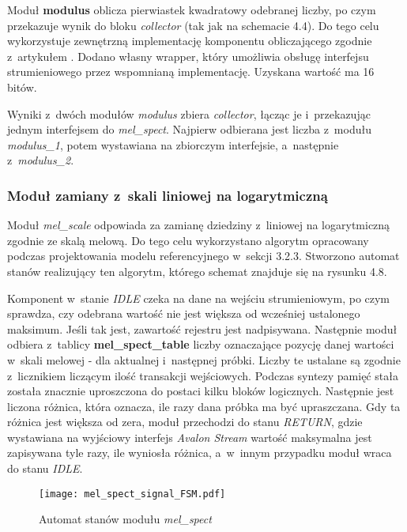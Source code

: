Moduł \textbf{modulus} oblicza pierwiastek kwadratowy odebranej liczby, po czym przekazuje wynik do bloku \textit{collector} (tak jak na schemacie 4.4). Do tego celu wykorzystuje zewnętrzną implementację komponentu obliczającego zgodnie z~artykułem \cite{Root}. Dodano własny wrapper, który umożliwia obsługę interfejsu strumieniowego przez wspomnianą implementację. Uzyskana wartość ma 16 bitów.

Wyniki z~dwóch modułów \textit{modulus} zbiera \textit{collector}, łącząc je i~przekazując jednym interfejsem do \textit{mel\_spect}. Najpierw odbierana jest liczba z~modułu \textit{modulus\_1}, potem wystawiana na zbiorczym interfejsie, a~następnie z~\textit{modulus\_2}.

\subsubsection{Moduł zamiany z~skali liniowej na logarytmiczną}

Moduł \textit{mel\_scale} odpowiada za zamianę dziedziny z~liniowej na logarytmiczną zgodnie ze skalą melową. Do tego celu wykorzystano algorytm opracowany podczas projektowania modelu referencyjnego w~sekcji 3.2.3. Stworzono automat stanów realizujący ten algorytm, którego schemat znajduje się na rysunku 4.8.

Komponent w~stanie \textit{IDLE} czeka na dane na wejściu strumieniowym, po czym sprawdza, czy odebrana wartość nie jest większa od wcześniej ustalonego maksimum. Jeśli tak jest, zawartość rejestru jest nadpisywana. Następnie moduł odbiera z~tablicy \textbf{mel\_spect\_table} liczby oznaczające pozycję danej wartości w~skali melowej - dla aktualnej i~następnej próbki. Liczby te ustalane są zgodnie z~licznikiem liczącym ilość transakcji wejściowych. Podczas syntezy pamięć stała została znacznie uproszczona do postaci kilku bloków logicznych. Następnie jest liczona różnica, która oznacza, ile razy dana próbka ma być upraszczana. Gdy ta różnica jest większa od zera, moduł przechodzi do stanu \textit{RETURN}, gdzie wystawiana na wyjściowy interfejs \textit{Avalon Stream} wartość maksymalna jest zapisywana tyle razy, ile wyniosła różnica, a~w~innym przypadku moduł wraca do stanu \textit{IDLE}.

\begin{figure}[h]
	\centering
	\texttt{[image: mel\_spect\_signal\_FSM.pdf]}
	\caption{Automat stanów modułu \textit{mel\_spect}}
\end{figure}
\FloatBarrier %

